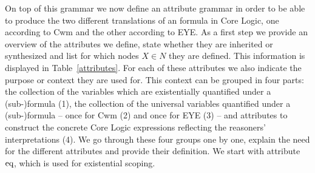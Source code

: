 On top of this grammar we now define an attribute grammar in order to be able to produce the two different translations %
of an \nthree formula in \nthree Core Logic, one according to Cwm and the other according to EYE.
As a first step we provide an overview of the attributes we define, state whether they are inherited or synthesized and list for which nodes $X\in N$ they are defined.
This  information is displayed in Table~\ref{attributes}. 
For each of these attributes we also indicate the purpose or context they are used for. This context can be grouped in four parts:  the collection of the variables which are existentially 
quantified under a (sub-)formula (1), the collection
of the universal variables quantified under a (sub-)formula -- once for Cwm (2) and once for EYE (3) -- and attributes to construct the concrete 
\nthree Core Logic expressions
reflecting the reasoners' interpretations (4).
We go through these four groups one by one, explain the need for the different attributes and provide their definition. We start with attribute $\text{eq}$, which is used for existential scoping. 

